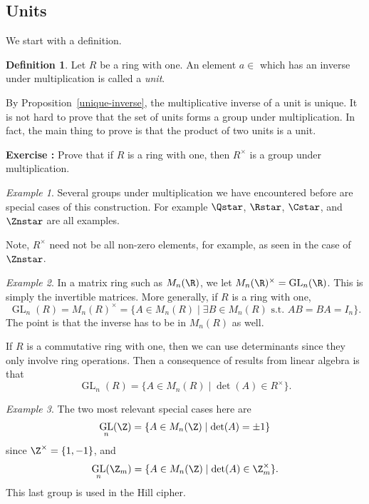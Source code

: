 \documentclass[12pt]{amsart}
\DeclareMathOperator{\GL}{GL}
\newcounter{probs}
\newenvironment{prob}{%
  \refstepcounter{probs}
  \par\medskip\noindent\textbf{Exercise \theprobs:} }{\par\medskip}
\theoremstyle{plain}
\theoremstyle{definition}
\newtheorem{defn}[thm]{Definition}
\theoremstyle{remark}
\newtheorem*{exam}{Example}
\begin{document}
\subsection{Units}
We start with a definition.
\begin{defn}
Let $R$ be a ring with one.  An element $a\in $ which has an inverse under
multiplication is called a \emph{unit}.  
\end{defn}
By Proposition~\ref{unique-inverse}, the multiplicative inverse of a unit
is unique.  It is not hard to prove that the set of units forms a
group under multiplication.  In fact, the main thing to prove is that
the product of two units is a unit.
\begin{prob}
  Prove that if $R$ is a ring with one, then $R^\times$ is a group
  under multiplication.
\end{prob}
\begin{exam}
  Several groups under multiplication we have encountered before are
  special cases of this construction.  For example $\Qstar$, $\Rstar$,
  $\Cstar$, and $\Znstar$ are all examples.  
\end{exam}
Note, $R^\times$ need not be all non-zero elements, for example, as
seen in the case of $\Znstar$.
\begin{exam}
  In a matrix ring such as $M_n(\R)$, we let $M_n(\R)^\times =
  \GL_n(\R)$.  This is simply the invertible matrices.  More
  generally, if $R$ is a ring with one,
  \[ \GL_n(R)= M_n(R)^\times = \{A\in M_n(R) \mid \exists B\in M_n(R)
  \text{ s.t. } AB=BA=I_n\}.\]
  The point is that the inverse has to be in $M_n(R)$ as well.
\end{exam}

If $R$ is a commutative ring with one, then we can use determinants
since they only involve ring operations.  Then a consequence of
results from linear algebra is that
\[ \GL_n(R) = \{A\in M_n(R)\mid \det(A)\in R^\times\}.\]
\begin{exam}
  The two most relevant special cases here are
  \[ \GL_n(\Z) = \{A\in M_n(\Z)\mid \det(A)=\pm 1\}\]
  since $\Z^\times = \{1,-1\}$, and
  \[ \GL_n(\Z_m) = \{A\in M_n(\Z)\mid \det(A)\in \Z_m^\times\}.\]
  This last group is used in the Hill cipher.
\end{exam}
\end{document}
